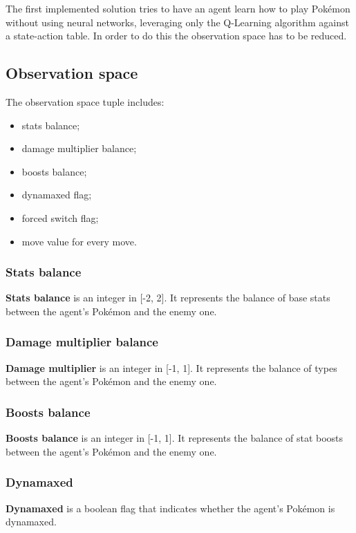 \documentclass{article}
\begin{document}
The first implemented solution tries to have an agent learn how to play Pokémon without using neural networks, leveraging only the Q-Learning algorithm against a state-action table.
In order to do this the observation space has to be reduced.

\subsection{Observation space}

The observation space tuple includes:
\begin{itemize}
    \item stats balance;
    \item damage multiplier balance;
    \item boosts balance;
    \item dynamaxed flag;
    \item forced switch flag;
    \item move value for every move.
\end{itemize}

\subsubsection{Stats balance}

\textbf{Stats balance} is an integer in [-2, 2].
It represents the balance of base stats between the agent's Pokémon and the enemy one.

\subsubsection{Damage multiplier balance}

\textbf{Damage multiplier} is an integer in [-1, 1].
It represents the balance of types between the agent's Pokémon and the enemy one.

\subsubsection{Boosts balance}

\textbf{Boosts balance} is an integer in [-1, 1].
It represents the balance of stat boosts between the agent's Pokémon and the enemy one.

\subsubsection{Dynamaxed}

\textbf{Dynamaxed} is a boolean flag that indicates whether the agent's Pokémon is dynamaxed.
\end{document}
